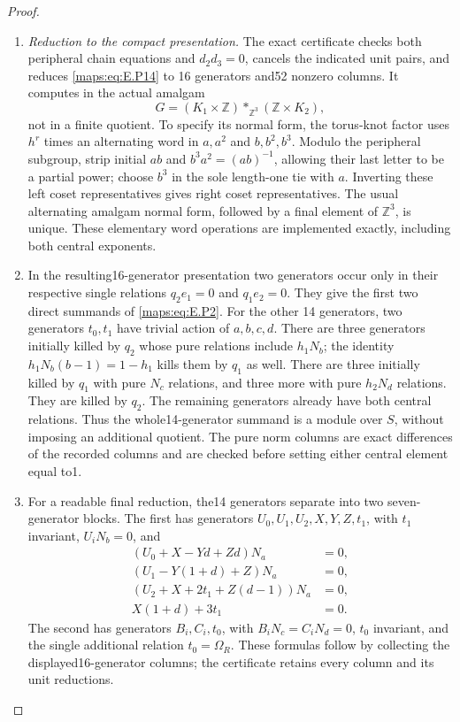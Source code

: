 \begin{proof}
\begin{enumerate}[label=\arabic*.,leftmargin=*]
\item \emph{Reduction to the compact presentation.}
The exact certificate
 checks both
peripheral chain equations and $d_2d_3=0$, cancels
the indicated unit pairs, and reduces \eqref{maps:eq:E.P14} to
16 generators and52 nonzero columns. It computes
in the actual amalgam
\[
 G=(K_1\times\mathbb Z)\mathop{*}_{\mathbb Z^3}
                                      (\mathbb Z\times K_2),
 \tag{E.P15}\label{maps:eq:E.P15}
\]
not in a finite quotient. To specify its normal
form, the torus-knot factor uses $h^r$ times an
alternating word in $a,a^2$ and $b,b^2,b^3$.
Modulo the peripheral subgroup, strip initial
$ab$ and $b^3a^2=(ab)^{-1}$, allowing their last
letter to be a partial power; choose $b^3$ in
the sole length-one tie with $a$. Inverting these
left coset representatives gives right coset
representatives. The usual alternating amalgam
normal form, followed by a final element of
$\mathbb Z^3$, is unique. These elementary word
operations are implemented exactly, including
both central exponents.

\item In the resulting16-generator presentation two
generators occur only in their respective single
relations $q_2e_1=0$ and $q_1e_2=0$. They give the
first two direct summands of \eqref{maps:eq:E.P2}. For the other
14 generators, two generators $t_0,t_1$ have
trivial action of $a,b,c,d$. There are three
generators initially killed by $q_2$ whose pure
relations include $h_1N_b$; the identity
$h_1N_b(b-1)=1-h_1$ kills them by $q_1$ as well.
There are three initially killed by $q_1$ with
pure $N_c$ relations, and three more with pure
$h_2N_d$ relations. They are killed by $q_2$.
The remaining generators already have both
central relations. Thus the whole14-generator
summand is a module over $S$, without imposing
an additional quotient. The pure norm columns
are exact differences of the recorded columns
and are checked before setting either central
element equal to1.

\item For a readable final reduction, the14 generators
separate into two seven-generator blocks. The
first has generators $U_0,U_1,U_2,X,Y,Z,t_1$,
with $t_1$ invariant, $U_iN_b=0$, and
\[
 \begin{split}
 (U_0+X-Yd+Zd)N_a&=0,\\
 (U_1-Y(1+d)+Z)N_a&=0,\\
 (U_2+X+2t_1+Z(d-1))N_a&=0,\\
 X(1+d)+3t_1&=0.
 \end{split}
 \tag{E.P16}\label{maps:eq:E.P16}
\]
The second has generators $B_i,C_i,t_0$, with
$B_iN_c=C_iN_d=0$, $t_0$ invariant, and the single
additional relation $t_0=\Omega_R$. These formulas
follow by collecting the displayed16-generator
columns; the certificate retains every column
and its unit reductions.


\end{enumerate}
\end{proof}
